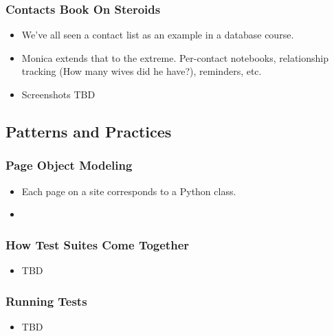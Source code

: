 \begin{frame}
  \frametitle{Contacts Book On Steroids}
  \begin{itemize}
    \item We've all seen a contact list as an example in a database course.
    \item Monica extends that to the extreme. Per-contact notebooks, relationship tracking (How many wives did he have?), reminders, etc.
    \item Screenshots TBD
  \end{itemize}
\end{frame}

\subsection{Patterns and Practices}

\begin{frame}
  \frametitle{Page Object Modeling}
  \begin{itemize}
    \item Each page on a site corresponds to a Python class.
    \item 
  \end{itemize}
\end{frame}

\begin{frame}
  \frametitle{How Test Suites Come Together}
  \begin{itemize}
    \item TBD
  \end{itemize}
\end{frame}

\begin{frame}
  \frametitle{Running Tests}
  \begin{itemize}
    \item TBD
  \end{itemize}
\end{frame}

